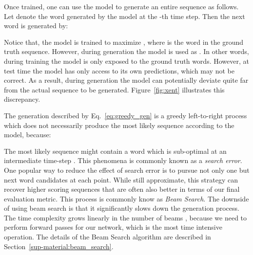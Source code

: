 \documentclass{article} \usepackage{iclr2016_conference,times}
\begin{document}
Once trained, one can use the model to generate an entire sequence as follows. Let  denote the word generated by the model at the -th time step. Then the next word  is generated by: 

Notice that, the model is trained
to maximize , where  is the word in the ground truth sequence. However, during generation the model is used as  
. In other words, during training the model is only exposed 
to the ground truth words. However, at test time the model has only
access to its own predictions, which may not be correct. As a result, during generation the model can potentially deviate quite far from the actual sequence to be generated. Figure~\ref{fig:xent} illustrates this discrepancy. 

The generation described by Eq.~\eqref{eq:greedy_gen} is
a greedy left-to-right process which does not necessarily produce
the most likely sequence according to the model, because:

The most likely sequence  might contain a word   which is sub-optimal at an intermediate time-step . This phenomena is commonly known as a {\it search error}. 
One popular way to reduce the effect of search error is to pursue not only one but  next word 
candidates at each point. While still approximate, this strategy can recover 
higher scoring sequences that are often also better in terms of our final evaluation metric.
This process is commonly know as {\it Beam Search}. The downside of using beam search is that it significantly slows down 
the generation process. The time complexity 
grows linearly in the number of beams , because we need to perform 
 forward passes for our network, which is the most time intensive operation. 
The details of the 
Beam Search algorithm are described in Section~\ref{sup-material:beam_search}.
\end{document}
